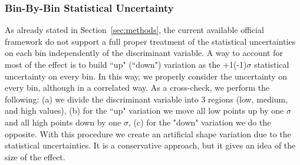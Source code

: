 \subsubsection{Bin-By-Bin Statistical Uncertainty}
As already stated in Section~\ref{sec:methods}, the current available official 
framework do not support a full proper treatment of the statistical 
uncertainties on each bin independently of the discriminant variable. A way to
account for most of the effect is to build ``up" (``down") variation as the
+1(-1)$\sigma$ statistical uncertainty on every bin. In this way, we properly
consider the uncertainty on every bin, although in a correlated way. As a
cross-check, we perform the following: (a) we divide the discriminant
variable into 3 regions (low, medium, and high values), (b) for the ``up" 
variation we move all low points up by one $\sigma$ and all high points down 
by one $\sigma$, (c) for the "down" variation we do the opposite. With this
procedure we create an artificial shape variation due to the statistical
uncertainties. It is a conservative approach, but it gives an idea of the size of
the effect.
